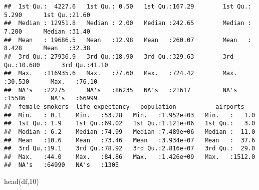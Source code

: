 \documentclass[
]{article}
\newenvironment{Shaded}{\begin{snugshade}}{\end{snugshade}}
\newcommand{\DecValTok}[1]{\textcolor[rgb]{0.86,0.86,0.80}{#1}}
\newcommand{\KeywordTok}[1]{\textcolor[rgb]{0.94,0.87,0.69}{#1}}
\newcommand{\NormalTok}[1]{\textcolor[rgb]{0.80,0.80,0.80}{#1}}
\begin{document}
\begin{verbatim}
##  1st Qu.:  4227.6   1st Qu.: 0.50   1st Qu.:167.29        1st Qu.: 5.290      1st Qu.:21.60  
##  Median : 12951.8   Median : 2.00   Median :242.65        Median : 7.200      Median :31.40  
##  Mean   : 19686.5   Mean   :12.98   Mean   :260.07        Mean   : 8.428      Mean   :32.38  
##  3rd Qu.: 27936.9   3rd Qu.:18.90   3rd Qu.:329.63        3rd Qu.:10.680      3rd Qu.:41.10  
##  Max.   :116935.6   Max.   :77.60   Max.   :724.42        Max.   :30.530      Max.   :76.10  
##  NA's   :22275      NA's   :86235   NA's   :21617         NA's   :15586       NA's   :66999  
##  female_smokers  life_expectancy   population           airports     
##  Min.   : 0.1    Min.   :53.28   Min.   :1.952e+03   Min.   :   1.0  
##  1st Qu.: 1.9    1st Qu.:69.02   1st Qu.:1.121e+06   1st Qu.:   3.0  
##  Median : 6.2    Median :74.99   Median :7.489e+06   Median :  11.0  
##  Mean   :10.6    Mean   :73.46   Mean   :3.934e+07   Mean   :  37.6  
##  3rd Qu.:19.1    3rd Qu.:78.92   3rd Qu.:2.816e+07   3rd Qu.:  29.0  
##  Max.   :44.0    Max.   :84.86   Max.   :1.426e+09   Max.   :1512.0  
##  NA's   :64990   NA's   :1305
\end{verbatim}

\begin{Shaded}
\begin{Highlighting}[]
\KeywordTok{head}\NormalTok{(df,}\DecValTok{10}\NormalTok{)}
\end{Highlighting}
\end{Shaded}
\end{document}
